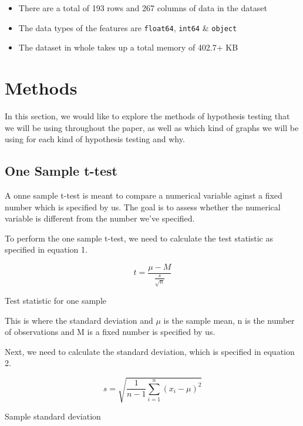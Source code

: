 \documentclass[a4paper, twocolumn]{article}
\begin{document}
\begin{itemize}
    \item There are a total of 193 rows and 267 columns of data in the dataset
    \item The data types of the features are \texttt{float64}, \texttt{int64} \& \texttt{object}
    \item The dataset in whole takes up a total memory of 402.7+ KB
\end{itemize}

\section{Methods}
In this section, we would like to explore the methods of hypothesis testing that we will be using throughout the
paper, as well as which kind of graphs we will be using for each kind of hypothesis testing and why.

\subsection{One Sample t-test}
A onne sample t-test is meant to compare a numerical variable aginst a fixed number which is specified by us. The
goal is to assess whether the numerical variable is different from the number we've specified. 

To perform the one sample t-test, we need to calculate the test statistic as specified in equation 1.

\begin{equation}
    t = \frac{\mu - M}{\frac{s}{\sqrt{n}}}
    \label{eq:test-statistic}
    \end{equation}
    
    \begin{center}
    Test statistic for one sample
    \end{center}

This is where the standard deviation and $\mu$ is the sample mean, n is the number of observations and M is a 
fixed number is specified by us.

Next, we need to calculate the standard deviation, which is specified in equation 2.

\begin{equation}
    s = \sqrt{\frac{1}{n-1} \sum_{i=1}^{n} (x_i - \mu)^2}
    \label{eq:sample-standard-deviation}
    \end{equation}

    \begin{center}
    Sample standard deviation
    \end{center}
\end{document}
